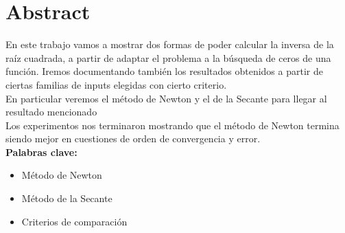 \section{Abstract}

En este trabajo vamos a mostrar dos formas de poder
calcular la inversa de la raíz cuadrada, a partir de adaptar el problema a la
búsqueda de ceros de una función. Iremos documentando también los resultados
obtenidos a partir de ciertas familias de inputs elegidas con cierto
criterio.\\

En particular veremos el método de Newton y el de la Secante para llegar al
resultado mencionado\\

Los experimentos nos terminaron mostrando que el método de Newton termina
siendo mejor en cuestiones de orden de convergencia y error.\\

{\bf Palabras clave:}
\begin{itemize} 
    \item Método de Newton 
    \item Método de la Secante 
    \item Criterios de comparación 
\end{itemize}
